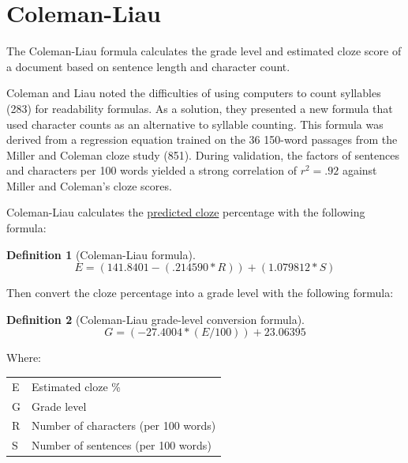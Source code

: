 \documentclass[
]{book}
\theoremstyle{definition}
\newtheorem{definition}{Definition}[chapter]
\theoremstyle{definition}
\theoremstyle{definition}
\theoremstyle{definition}
\theoremstyle{remark}
\begin{document}
\newpage

\hypertarget{coleman-liau-test}{%
\section{\texorpdfstring{Coleman-Liau}{Coleman-Liau}}\label{coleman-liau-test}}

The Coleman-Liau formula calculates the grade level and estimated cloze score of a document based on sentence length and character count.

Coleman and Liau noted the difficulties of using computers to count syllables (283) for readability formulas. As a solution, they presented a new formula that used character counts as an alternative to syllable counting. This formula was derived from a regression equation trained on the 36 150-word passages from the Miller and Coleman cloze study (851). During validation, the factors of sentences and characters per 100 words yielded a strong correlation of \(r^2 = .92\) against Miller and Coleman's cloze scores.

Coleman-Liau calculates the \protect\hyperlink{cloze}{predicted cloze} percentage with the following formula:

\begin{definition}[Coleman-Liau formula]
\protect\hypertarget{def:colemanliaucloze}{}{\label{def:colemanliaucloze} {} }\[
E = (141.8401 - (.214590*R)) + (1.079812*S)
\]
\end{definition}

Then convert the cloze percentage into a grade level with the following formula:

\begin{definition}[Coleman-Liau grade-level conversion formula]
\protect\hypertarget{def:colemanliaugrade}{}{\label{def:colemanliaugrade} {} }\[
G = (-27.4004*(E/100)) + 23.06395
\]
\end{definition}

Where:

\begin{longtable}[]{@{}
  >{\raggedright\arraybackslash}p{}
  >{\raggedright\arraybackslash}p{}@{}}
\toprule
\endhead
E & Estimated cloze \% \\
G & Grade level \\
R & Number of characters (per 100 words) \\
S & Number of sentences (per 100 words) \\
\bottomrule
\end{longtable}
\end{document}
